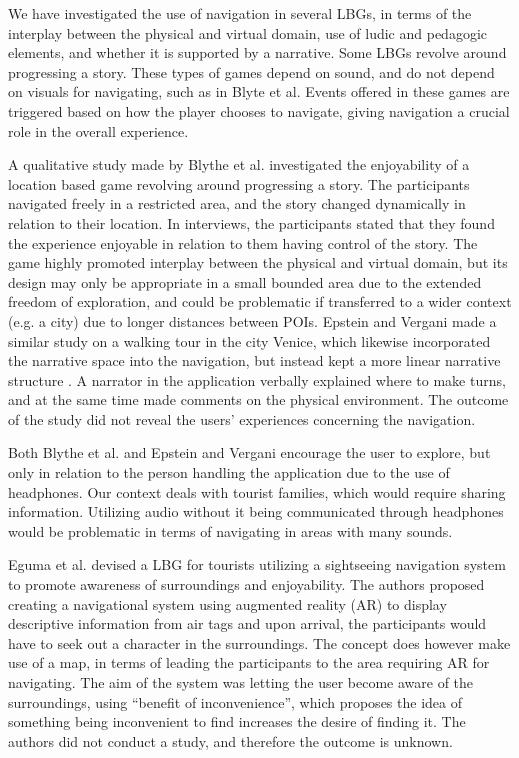 We have investigated the use of navigation in several LBGs, in terms of the interplay between the physical and virtual domain, use of ludic and pedagogic elements, and whether it is supported by a narrative. Some LBGs revolve around progressing a story. These types of games depend on sound, and do not depend on visuals for navigating, such as in Blyte et al. Events offered in these games are triggered based on how the player chooses to navigate, giving navigation a crucial role in the overall experience.

A qualitative study made by Blythe et al. investigated the enjoyability of a location based game revolving around progressing a story\cite{InterdisciplinaryCriticism}. The participants navigated freely in a restricted area, and the story changed dynamically in relation to their location. In interviews, the participants stated that they found the experience enjoyable in relation to them having control of the story. The game highly promoted interplay between the physical and virtual domain, but its design may only be appropriate in a small bounded area due to the extended freedom of exploration, and could be problematic if transferred to a wider context (e.g. a city) due to longer distances between POIs. Epstein and Vergani made a similar study on a walking tour in the city Venice, which likewise incorporated the narrative space into the navigation, but instead kept a more linear narrative structure \cite{MobileTechnologies}. A narrator in the application verbally explained where to make turns, and at the same time made comments on the physical environment. The outcome of the study did not reveal the users' experiences concerning the navigation.

Both Blythe et al. and Epstein and Vergani encourage the user to explore, but only in relation to the person handling the application due to the use of headphones. Our context deals with tourist families, which would require sharing information. Utilizing audio without it being communicated through headphones would be problematic in terms of navigating in areas with many sounds. 

Eguma et al. devised a LBG for tourists utilizing a sightseeing navigation system to promote awareness of surroundings and enjoyability\cite{HideAndSeek}. The authors proposed creating a navigational system using augmented reality (AR) to display descriptive information from air tags and upon arrival, the participants would have to seek out a character in the surroundings. The concept does however make use of a map, in terms of leading the participants to the area requiring AR for navigating. The aim of the system was letting the user become aware of the surroundings, using “benefit of inconvenience”, which proposes the idea of something being inconvenient to find increases the desire of finding it. The authors did not conduct a study, and therefore the outcome is unknown.


